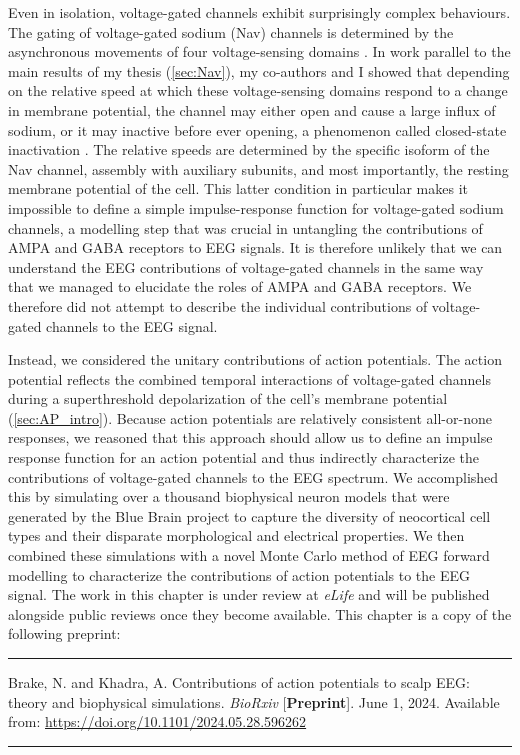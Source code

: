 Even in isolation, voltage-gated channels exhibit surprisingly complex behaviours. The gating of voltage-gated sodium (Nav) channels is determined by the asynchronous movements of four voltage-sensing domains \cite{Ahern2016}. In work parallel to the main results of my thesis  (\autoref{sec:Nav}), my co-authors and I showed that depending on the relative speed at which these voltage-sensing domains respond to a change in membrane potential, the channel may either open and cause a large influx of sodium, or it may inactive before ever opening, a phenomenon called closed-state inactivation \cite{Brake2022,Armstrong2006}. The relative speeds are determined by the specific isoform of the Nav channel, assembly with auxiliary subunits, and most importantly, the resting membrane potential of the cell. This latter condition in particular makes it impossible to define a simple impulse-response function for voltage-gated sodium channels, a modelling step that was crucial in untangling the contributions of AMPA and GABA receptors to EEG signals. It is therefore unlikely that we can understand the EEG contributions of voltage-gated channels in the same way that we managed to elucidate the roles of AMPA and GABA receptors. We therefore did not attempt to describe the individual contributions of voltage-gated channels to the EEG signal.

Instead, we considered the unitary contributions of action potentials. The action potential reflects the combined temporal interactions of voltage-gated channels during a superthreshold depolarization of the cell's membrane potential (\autoref{sec:AP_intro}). Because action potentials are relatively consistent all-or-none responses, we reasoned that this approach should allow us to define an impulse response function for an action potential and thus indirectly characterize the contributions of voltage-gated channels to the EEG spectrum. We accomplished this by simulating over a thousand biophysical neuron models that were generated by the Blue Brain project \cite{Markram2015} to capture the diversity of neocortical cell types and their disparate morphological and electrical properties. We then combined these simulations with a novel Monte Carlo method of EEG forward modelling to characterize the contributions of action potentials to the EEG signal. The work in this chapter is under review at \textit{eLife} and will be published alongside public reviews once they become available. This chapter is a copy of the following preprint:

\vspace{1em}
\hrule
\vspace{.5em}
\noindent
\hangindent=1cm
Brake, N. and Khadra, A. Contributions of action potentials to scalp EEG: theory and biophysical simulations. \textit{BioRxiv} [\textbf{Preprint}]. June 1, 2024. Available from: \url{https://doi.org/10.1101/2024.05.28.596262}
\vspace{.75em}
\hrule
\vspace{.65em}

